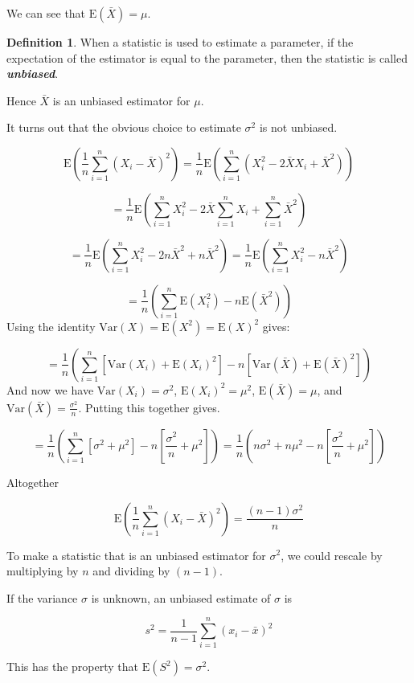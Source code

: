 \documentclass[
]{book}
\theoremstyle{definition}
\newtheorem{definition}{Definition}[chapter]
\theoremstyle{definition}
\theoremstyle{definition}
\theoremstyle{definition}
\theoremstyle{remark}
\begin{document}
We can see that \(\text{E}(\bar{X})=\mu\).

\begin{definition}
When a statistic is used to estimate a parameter, if the expectation of the estimator is equal to the parameter, then the statistic is called \textbf{\emph{unbiased}}.

Hence \(\bar{X}\) is an unbiased estimator for \(\mu\).
\end{definition}

It turns out that the obvious choice to estimate \(\sigma^2\) is not unbiased.

\[\text{E}\left( \frac{1}{n}\sum_{i=1}^{n}(X_i-\bar{X})^2 \right) = \frac{1}{n}\text{E}\left( \sum_{i=1}^n (X_i^2-2\bar{X} X_i +\bar{X}^2)\right) \]

\[=\frac{1}{n}\text{E}\left( \sum_{i=1}^n X_i^2 -2\bar{X}\sum_{i=1}^n{X_i} +\sum_{i=1}^n \bar{X}^2 \right) \]

\[=\frac{1}{n}\text{E}\left( \sum_{i=1}^n X_i^2 -2n\bar{X}^2 +n \bar{X}^2 \right) =\frac{1}{n}\text{E}\left( \sum_{i=1}^n X_i^2 -n\bar{X}^2  \right)  \]

\[=\frac{1}{n}\left( \sum_{i=1}^n \text{E}(X_i^2) -n\text{E}(\bar{X}^2)  \right) \]
Using the identity \(\text{Var}(X)= \text{E}(X^2)=\text{E}(X)^2\) gives:

\[=\frac{1}{n}\left( \sum_{i=1}^n [\text{Var}(X_i)+\text{E}(X_i)^2] -n[\text{Var}(\bar{X})+\text{E}(\bar{X})^2]  \right) \]
And now we have \(\text{Var}(X_i) = \sigma^2\), \(\text{E}(X_i)^2 = \mu^2\), \(\text{E}(\bar{X}) = \mu\), and \(\text{Var}(\bar{X})=\frac{\sigma^2}{n}\). Putting this together gives.

\[=\frac{1}{n}\left( \sum_{i=1}^n [\sigma^2+\mu^2] -n\left[\frac{\sigma^2}{n}+\mu^2\right]  \right) =\frac{1}{n}\left( n\sigma^2+n\mu^2-n\left[\frac{\sigma^2}{n}+\mu^2\right]\right)\]

Altogether

\[\text{E}\left( \frac{1}{n}\sum_{i=1}^{n}(X_i-\bar{X})^2 \right) = \frac{(n-1)\sigma^2}{n} \]

To make a statistic that is an unbiased estimator for \(\sigma^2\), we could rescale by multiplying by \(n\) and dividing by \((n-1)\).

If the variance \(\sigma\) is unknown, an unbiased estimate of \(\sigma\) is

\[s^2 = \frac{1}{n-1}\sum_{i=1}^n (x_i-\bar{x})^2\]

This has the property that \(\text{E}(S^2) = \sigma^2\).
\end{document}
